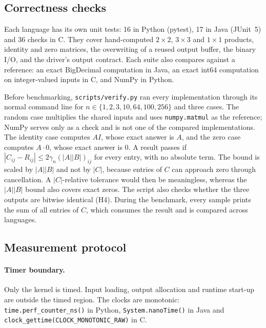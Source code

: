 \documentclass[11pt,a4paper]{article}
\begin{document}
\subsection{Correctness checks}
\label{sec:correctness}

Each language has its own unit tests: 16 in Python (pytest), 17 in Java
(JUnit~5) and 36 checks in C. They cover hand-computed $2\times2$, $3\times3$ and
$1\times1$ products, identity and zero matrices, the overwriting of a reused
output buffer, the binary I/O, and the driver's output contract. Each suite also
compares against a reference: an exact BigDecimal computation in Java, an exact
int64 computation on integer-valued inputs in C, and NumPy in Python.

Before benchmarking, \texttt{scripts/verify.py} ran every implementation through
its normal command line for $n\in\{1,2,3,10,64,100,256\}$ and three cases. The
random case multiplies the shared inputs and uses \texttt{numpy.matmul} as the
reference; NumPy serves only as a check and is not one of the compared
implementations. The identity case computes $AI$, whose exact answer is $A$, and
the zero case computes $A\cdot0$, whose exact answer is $0$. A result passes if
$|C_{ij}-R_{ij}|\le 2\gamma_n(|A||B|)_{ij}$ for every entry, with no absolute
term. The bound is scaled by $|A||B|$ and not by $|C|$, because entries of $C$
can approach zero through cancellation. A $|C|$-relative tolerance would then be
meaningless, whereas the $|A||B|$ bound also covers exact zeros. The script also
checks whether the three outputs are bitwise identical (H4). During the
benchmark, every sample prints the sum of all entries of $C$, which consumes the
result and is compared across languages.

\subsection{Measurement protocol}
\label{sec:protocol}

\paragraph{Timer boundary.} Only the kernel is timed. Input loading, output
allocation and runtime start-up are outside the timed region. The clocks are
monotonic: \texttt{time.perf\_counter\_ns()} in Python, \texttt{System.nanoTime()}
in Java and \texttt{clock\_gettime(CLOCK\_MONOTONIC\_RAW)} in C.
\end{document}
